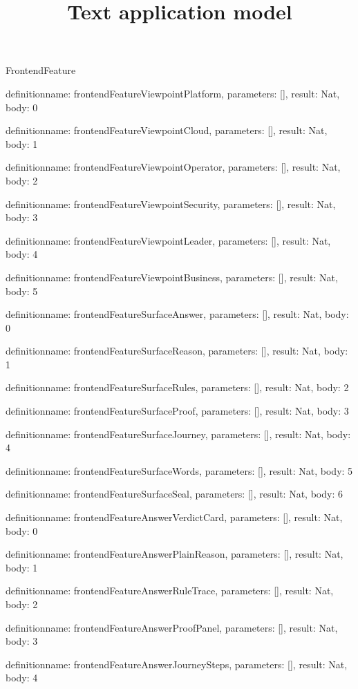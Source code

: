 \begin{lexlean}{FrontendFeature}
\title{Text application model}
\begin{semanticmodule}
definition{name: frontendFeatureViewpointPlatform, parameters: [], result: Nat, body: 0}

definition{name: frontendFeatureViewpointCloud, parameters: [], result: Nat, body: 1}

definition{name: frontendFeatureViewpointOperator, parameters: [], result: Nat, body: 2}

definition{name: frontendFeatureViewpointSecurity, parameters: [], result: Nat, body: 3}

definition{name: frontendFeatureViewpointLeader, parameters: [], result: Nat, body: 4}

definition{name: frontendFeatureViewpointBusiness, parameters: [], result: Nat, body: 5}

definition{name: frontendFeatureSurfaceAnswer, parameters: [], result: Nat, body: 0}

definition{name: frontendFeatureSurfaceReason, parameters: [], result: Nat, body: 1}

definition{name: frontendFeatureSurfaceRules, parameters: [], result: Nat, body: 2}

definition{name: frontendFeatureSurfaceProof, parameters: [], result: Nat, body: 3}

definition{name: frontendFeatureSurfaceJourney, parameters: [], result: Nat, body: 4}

definition{name: frontendFeatureSurfaceWords, parameters: [], result: Nat, body: 5}

definition{name: frontendFeatureSurfaceSeal, parameters: [], result: Nat, body: 6}

definition{name: frontendFeatureAnswerVerdictCard, parameters: [], result: Nat, body: 0}

definition{name: frontendFeatureAnswerPlainReason, parameters: [], result: Nat, body: 1}

definition{name: frontendFeatureAnswerRuleTrace, parameters: [], result: Nat, body: 2}

definition{name: frontendFeatureAnswerProofPanel, parameters: [], result: Nat, body: 3}

definition{name: frontendFeatureAnswerJourneySteps, parameters: [], result: Nat, body: 4}


\end{semanticmodule}
\end{lexlean}
